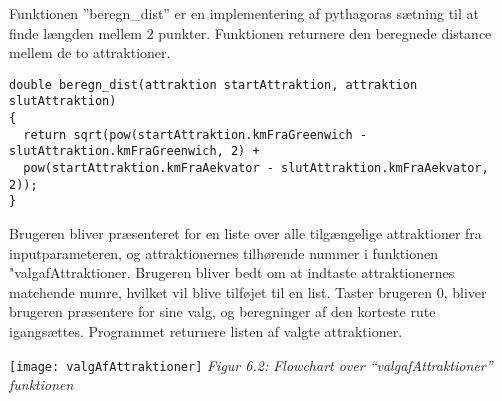 Funktionen ”beregn\_dist” er en implementering af pythagoras sætning til at finde længden mellem 2 punkter. Funktionen returnere den beregnede distance mellem de to attraktioner. \newline

\begin{lstlisting}
double beregn_dist(attraktion startAttraktion, attraktion slutAttraktion)
{
  return sqrt(pow(startAttraktion.kmFraGreenwich - slutAttraktion.kmFraGreenwich, 2) + 
  pow(startAttraktion.kmFraAekvator - slutAttraktion.kmFraAekvator, 2));
}
\end{lstlisting}

Brugeren bliver præsenteret for en liste over alle tilgængelige attraktioner fra inputparameteren, og attraktionernes tilhørende nummer i funktionen "valgafAttraktioner. Brugeren bliver bedt om at indtaste attraktionernes matchende numre, hvilket vil blive tilføjet til en list. Taster brugeren 0, bliver brugeren præsentere for sine valg, og beregninger af den korteste rute igangsættes. Programmet returnere listen af valgte attraktioner. \newline
\begin{flushleft}
	\texttt{[image: valgAfAttraktioner]}\newline
	\textit{Figur 6.2: Flowchart over “valgafAttraktioner” funktionen}
\end{flushleft}
